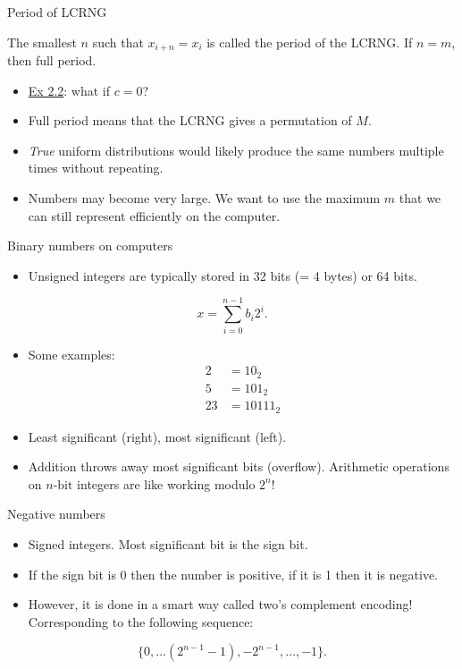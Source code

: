 \documentclass[10pt]{beamer}
\begin{document}
\begin{frame}[label={sec:org65623e2}]{Period of LCRNG}
\begin{definition}
The smallest $n$ such that $x_{i + n} = x_i$ is called the period of the LCRNG. If $n = m$, then full period.
\end{definition}

\begin{itemize}
\item \uline{Ex 2.2}: what if \(c = 0\)?

\item Full period means that the LCRNG gives a permutation of \(M\).

\item \emph{True} uniform distributions would likely produce the same numbers \alert{multiple
times without repeating}.

\item Numbers may become very large. We want to use the maximum \(m\) that we can
\alert{still represent efficiently on the computer}.
\end{itemize}
\end{frame}
\begin{frame}[label={sec:org147ad73}]{Binary numbers on computers}
\begin{itemize}
\item Unsigned integers are typically stored in 32 bits (= 4 bytes) or 64 bits.
\end{itemize}
$$x = \sum_{i = 0}^{n - 1} b_i 2^i.$$
\begin{itemize}
\item Some examples:
\begin{align*}
2 &= 10_2 \\
5 &= 101_2 \\
23 &= 10111_2
\end{align*}
\item Least significant (right), most significant (left).
\item Addition throws away most significant bits (overflow). \alert{Arithmetic operations
on \(n\text{-bit}\) integers are like working modulo \(2^n\)}!
\end{itemize}
\end{frame}
\begin{frame}[label={sec:org435786a}]{Negative numbers}
\begin{itemize}
\item Signed integers. Most significant bit is the \alert{sign bit}.
\item If the sign bit is 0 then the number is positive, if it is 1 then it is
negative.
\item However, it is done in a smart way called \alert{two's complement encoding}!
Corresponding to the following sequence:
\end{itemize}
$$\{ 0, \ldots (2^{n-1} - 1), -2^{n-1}, \ldots, -1 \}.$$
\end{frame}
\end{document}
